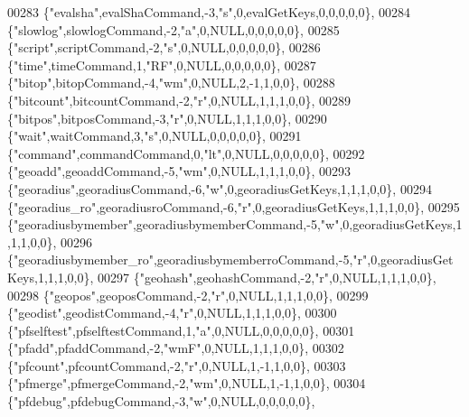 \begin{DoxyCode}
00283     \{\textcolor{stringliteral}{"evalsha"},evalShaCommand,-3,\textcolor{stringliteral}{"s"},0,evalGetKeys,0,0,0,0,0\},
00284     \{\textcolor{stringliteral}{"slowlog"},slowlogCommand,-2,\textcolor{stringliteral}{"a"},0,NULL,0,0,0,0,0\},
00285     \{\textcolor{stringliteral}{"script"},scriptCommand,-2,\textcolor{stringliteral}{"s"},0,NULL,0,0,0,0,0\},
00286     \{\textcolor{stringliteral}{"time"},timeCommand,1,\textcolor{stringliteral}{"RF"},0,NULL,0,0,0,0,0\},
00287     \{\textcolor{stringliteral}{"bitop"},bitopCommand,-4,\textcolor{stringliteral}{"wm"},0,NULL,2,-1,1,0,0\},
00288     \{\textcolor{stringliteral}{"bitcount"},bitcountCommand,-2,\textcolor{stringliteral}{"r"},0,NULL,1,1,1,0,0\},
00289     \{\textcolor{stringliteral}{"bitpos"},bitposCommand,-3,\textcolor{stringliteral}{"r"},0,NULL,1,1,1,0,0\},
00290     \{\textcolor{stringliteral}{"wait"},waitCommand,3,\textcolor{stringliteral}{"s"},0,NULL,0,0,0,0,0\},
00291     \{\textcolor{stringliteral}{"command"},commandCommand,0,\textcolor{stringliteral}{"lt"},0,NULL,0,0,0,0,0\},
00292     \{\textcolor{stringliteral}{"geoadd"},geoaddCommand,-5,\textcolor{stringliteral}{"wm"},0,NULL,1,1,1,0,0\},
00293     \{\textcolor{stringliteral}{"georadius"},georadiusCommand,-6,\textcolor{stringliteral}{"w"},0,georadiusGetKeys,1,1,1,0,0\},
00294     \{\textcolor{stringliteral}{"georadius\_ro"},georadiusroCommand,-6,\textcolor{stringliteral}{"r"},0,georadiusGetKeys,1,1,1,0,0\},
00295     \{\textcolor{stringliteral}{"georadiusbymember"},georadiusbymemberCommand,-5,\textcolor{stringliteral}{"w"},0,georadiusGetKeys,1,1,1,0,0\},
00296     \{\textcolor{stringliteral}{"georadiusbymember\_ro"},georadiusbymemberroCommand,-5,\textcolor{stringliteral}{"r"},0,georadiusGetKeys,1,1,1,0,0\},
00297     \{\textcolor{stringliteral}{"geohash"},geohashCommand,-2,\textcolor{stringliteral}{"r"},0,NULL,1,1,1,0,0\},
00298     \{\textcolor{stringliteral}{"geopos"},geoposCommand,-2,\textcolor{stringliteral}{"r"},0,NULL,1,1,1,0,0\},
00299     \{\textcolor{stringliteral}{"geodist"},geodistCommand,-4,\textcolor{stringliteral}{"r"},0,NULL,1,1,1,0,0\},
00300     \{\textcolor{stringliteral}{"pfselftest"},pfselftestCommand,1,\textcolor{stringliteral}{"a"},0,NULL,0,0,0,0,0\},
00301     \{\textcolor{stringliteral}{"pfadd"},pfaddCommand,-2,\textcolor{stringliteral}{"wmF"},0,NULL,1,1,1,0,0\},
00302     \{\textcolor{stringliteral}{"pfcount"},pfcountCommand,-2,\textcolor{stringliteral}{"r"},0,NULL,1,-1,1,0,0\},
00303     \{\textcolor{stringliteral}{"pfmerge"},pfmergeCommand,-2,\textcolor{stringliteral}{"wm"},0,NULL,1,-1,1,0,0\},
00304     \{\textcolor{stringliteral}{"pfdebug"},pfdebugCommand,-3,\textcolor{stringliteral}{"w"},0,NULL,0,0,0,0,0\},

\end{DoxyCode}
